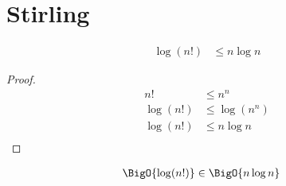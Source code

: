\section{Stirling}
\label{tree:sorting:stirling}

\begin{theorem}
\begin{align*}
\log(n!) &\leq n \log n
\end{align*}
\end{theorem}

\begin{proof}
\begin{align*}
n! & \leq n^n\\
\log(n!) & \leq \log(n^n)\\
\log(n!) & \leq n \log n\\
\end{align*}
\end{proof}



\begin{corollary}
\begin{align*}
\BigO{\log(n!)} &\in \BigO{n \log n}
\end{align*}
\end{corollary}